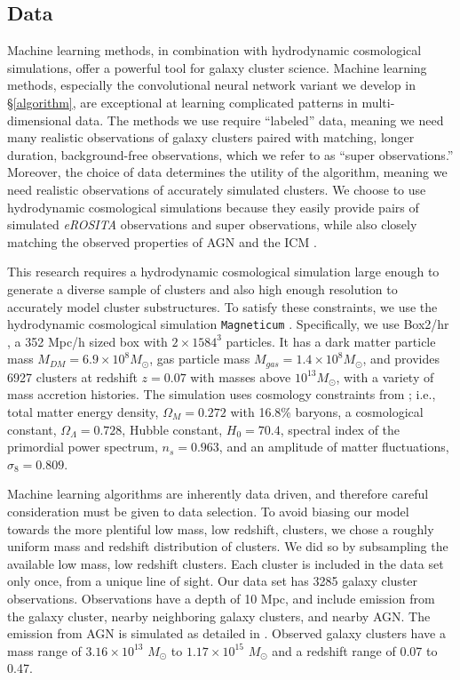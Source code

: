 \subsection{Data}\label{ch2_data}
Machine learning methods, in combination with hydrodynamic cosmological simulations, offer a powerful tool for galaxy cluster science. Machine learning methods, especially the convolutional neural network variant we develop in \S\ref{algorithm}, are exceptional at learning complicated patterns in multi-dimensional data. The methods we use require ``labeled'' data, meaning we need many realistic observations of galaxy clusters paired with matching, longer duration, background-free observations, which we refer to as ``super observations.'' Moreover, the choice of data determines the utility of the algorithm, meaning we need realistic observations of accurately simulated clusters. We choose to use hydrodynamic cosmological simulations because they easily provide pairs of simulated \textit{eROSITA} observations and super observations, while also closely matching the observed properties of AGN and the ICM \cite[see e.g.,][]{Hirschmann_2014, Rasia_2015, magneticum}. 

This research requires a hydrodynamic cosmological simulation large enough to generate a diverse sample of clusters and also high enough resolution to accurately model cluster substructures. To satisfy these constraints, we use the hydrodynamic cosmological simulation \texttt{Magneticum} \cite{magneticum}. Specifically, we use Box2/hr \cite{Hirschmann_2014}, a 352 Mpc/h sized  box with $2 \times 1584^3$ particles. It has a dark matter particle mass $M_{DM} = 6.9\times10^{8} M_{\odot}$, gas particle mass $M_{gas}=1.4\times10^{8}M_{\odot}$, and provides 6927 clusters at redshift $z=0.07$ with masses above $10^{13}M_{\odot}$, with a variety of mass accretion histories. The simulation uses cosmology constraints from \cite{Komatsu_2011}; i.e., total matter energy density, $\Omega_M = 0.272$ with 16.8\% baryons, a cosmological constant, $\Omega_{\Lambda} = 0.728$, Hubble constant, $H_0 = 70.4$, spectral index of the primordial power spectrum, $n_{s} = 0.963$, and an amplitude of matter fluctuations, $\sigma_8 = 0.809$.

Machine learning algorithms are inherently data driven, and therefore careful consideration must be given to data selection. To avoid biasing our model towards the more plentiful low mass, low redshift, clusters, we chose a roughly uniform mass and redshift distribution of clusters. We did so by subsampling the available low mass, low redshift clusters. Each cluster is included in the data set only once, from a unique line of sight. Our data set has 3285 galaxy cluster observations. Observations have a depth of 10 Mpc, and include emission from the galaxy cluster, nearby neighboring galaxy clusters, and nearby AGN. The emission from AGN is simulated as detailed in \cite{Biffi_2018}. Observed galaxy clusters have a mass range of $3.16 \times 10^{13}$ $M_{\odot}$ to $1.17 \times 10^{15}$ $M_{\odot}$ and a redshift range of 0.07 to 0.47.

